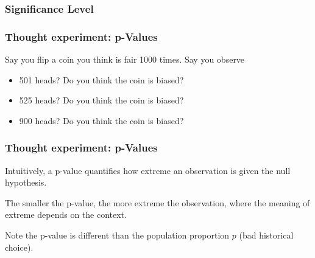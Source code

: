 \documentclass[handout]{beamer}
\newcommand{\blue}[1]{\textcolor{blue2}{#1}}
\begin{document}
\begin{frame}
\frametitle{Significance Level}
%
%
%
%
\end{frame}


\begin{frame}
\frametitle{Thought experiment: p-Values}
Say you flip a coin you think is fair 1000 times.  Say you observe
\begin{itemize}
\pause \item 501 heads? Do you think the coin is biased?
\pause \item 525 heads? Do you think the coin is biased?
\pause \item 900 heads? Do you think the coin is biased?
\end{itemize}

\end{frame}


\begin{frame}
\frametitle{Thought experiment: p-Values}

Intuitively, a \blue{p-value} quantifies how \blue{extreme} an observation is given the null hypothesis.  
  
\vskip 0.25cm

\pause The smaller the p-value, the more \blue{extreme} the observation, where the meaning of extreme depends on the context.  

\vskip 0.25cm

\pause Note the p-value is different than the population proportion $p$ (bad historical choice).

\end{frame}
\end{document}

